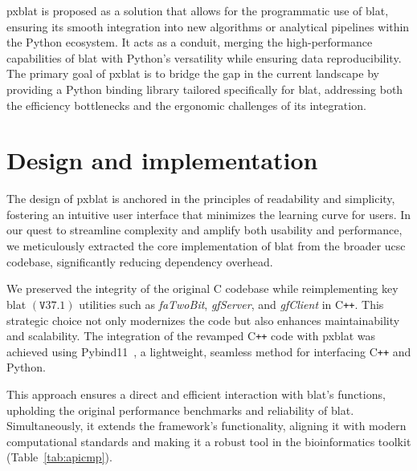 \documentclass[10pt,letterpaper]{article}
\begin{document}
\gls{pxblat} is proposed as a solution that allows for the programmatic use of \gls{blat}, ensuring its smooth integration into new algorithms or analytical pipelines within the Python ecosystem.
It acts as a conduit, merging the high-performance capabilities of \gls{blat} with Python's versatility while ensuring data reproducibility.
The primary goal of \gls{pxblat} is to bridge the gap in the current landscape by providing a Python binding library tailored specifically for \gls{blat}, addressing both the efficiency bottlenecks and the ergonomic challenges of its integration.

\section*{Design and implementation}
The design of \gls{pxblat} is anchored in the principles of readability and simplicity, fostering an intuitive user interface that minimizes the learning curve for users.
In our quest to streamline complexity and amplify both usability and performance, we meticulously extracted the core implementation of \gls{blat} from the broader \gls{ucsc} codebase, significantly reducing dependency overhead.

We preserved the integrity of the original C codebase while reimplementing key \gls{blat} \(\left(\mathtt{V}37.1\right)\) utilities such as \emph{faTwoBit}, \emph{gfServer}, and \emph{gfClient} in C\texttt{++}.
This strategic choice not only modernizes the code but also enhances maintainability and scalability.
The integration of the revamped C\texttt{++} code with \gls{pxblat} was achieved using Pybind11~\cite{pybind11}, a lightweight, seamless method for interfacing C\texttt{++} and Python.

This approach ensures a direct and efficient interaction with \gls{blat}'s functions, upholding the original performance benchmarks and reliability of \gls{blat}.
Simultaneously, it extends the framework's functionality, aligning it with modern computational standards and making it a robust tool in the bioinformatics toolkit (Table~\ref{tab:apicmp}).
\end{document}
